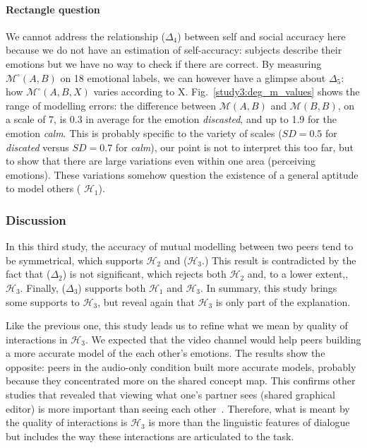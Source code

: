 \documentclass[natbib]{svjour3}
\newcommand{\gmodel}[2]{{$\mathcal{M}(#1, #2)$}}
\newcommand{\Model}[3]{{$\mathcal{M}^{\circ}(#1, #2, #3)$}}
\newcommand{\gModel}[2]{{$\mathcal{M}^{\circ}(#1, #2)$}}
\begin{document}
\paragraph{Rectangle question} We cannot address the relationship ($\Delta_4$)
between self and social accuracy here because we do not have an estimation of
self-accuracy: subjects describe their emotions but we have no way to check if
there are correct. By measuring \gModel{A}{B} on  18 emotional labels,
we can however have a glimpse about $\Delta_5$: how \Model{A}{B}{X} varies
according to X.  Fig.~\ref{study3:deg_m_values} shows the range of modelling
errors: the difference between \gmodel{A}{B} and \gmodel{B}{B}, on a scale of 7,
is 0.3 in average for the emotion \emph{discasted}, and up to 1.9 for the
emotion \emph{calm}. This is probably specific to the variety of scales  ($SD=
0.5$ for \emph{discated} versus $SD=0.7$ for \emph{calm}), our point is not to
interpret this too far, but to show that there are large variations even within one
area  (perceiving emotions). These variations somehow question the existence of
a general aptitude to model others ( $\mathcal{H}_{1}$).


\subsubsection*{Discussion} 

In this third study, the accuracy of mutual modelling  between two peers tend to
be symmetrical, which  supports $\mathcal{H}_{2}$ and ($\mathcal{H}_{3}$.)  This
result is contradicted by the fact that ($\Delta_2$) is not significant, which
rejects both $\mathcal{H}_{2}$ and, to a lower extent,,  $\mathcal{H}_{3}$.
Finally,  ($\Delta_3$) supports both  $\mathcal{H}_{1}$ and  $\mathcal{H}_{3}$.
In summary, this study brings some supports to  $\mathcal{H}_{3}$, but reveal
again that $\mathcal{H}_{3}$ is only part of the explanation.

Like the previous one, this study leads us to refine what we mean by quality of
interactions in $\mathcal{H}_{3}$. We  expected that the video channel would
help peers building a more accurate model of the each other's emotions.  The
results show the opposite: peers in the audio-only condition built more accurate
models, probably because they concentrated more on the shared concept map. This
confirms other studies that revealed that viewing what one's partner sees
(shared graphical editor) is more important than seeing each
other~\citep{gaver1993one,anderson1997impact}. Therefore, what is meant by the
quality of interactions is $\mathcal{H}_{3}$ is more than the linguistic features
of dialogue but includes the way these interactions are articulated to the task.
\end{document}
